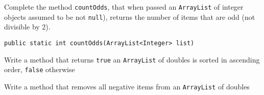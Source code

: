 \documentclass[11pt]{exam}
\begin{document}
\begin{questions}
\question Complete the method \texttt{countOdds}, that when passed an \texttt{ArrayList} of integer objects assumed to be not \texttt{null}), returns the number of items that are odd (not divisible by 2).

\begin{lstlisting}
public static int countOdds(ArrayList<Integer> list)	
\end{lstlisting}

\question Write a method that returns \texttt{true} an \texttt{ArrayList} of doubles is sorted in ascending order, \texttt{false} otherwise

\question Write a method that removes all negative items from an \texttt{ArrayList} of doubles

\end{questions}
\end{document}
